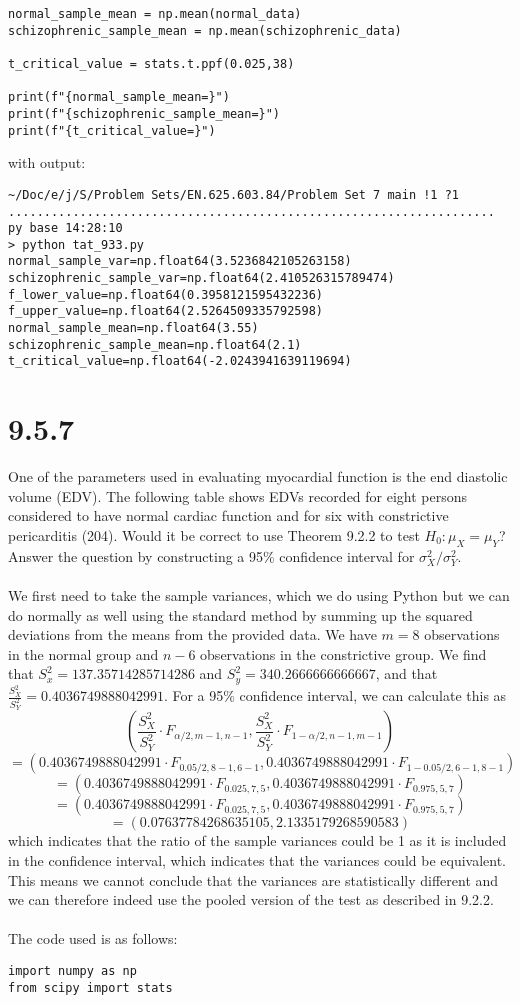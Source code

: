\documentclass{article}
\begin{document}
{\begin{verbatim}
normal_sample_mean = np.mean(normal_data)
schizophrenic_sample_mean = np.mean(schizophrenic_data)

t_critical_value = stats.t.ppf(0.025,38)

print(f"{normal_sample_mean=}")
print(f"{schizophrenic_sample_mean=}")
print(f"{t_critical_value=}")
\end{verbatim}
with output:
\begin{verbatim}
~/Doc/e/j/S/Problem Sets/EN.625.603.84/Problem Set 7 main !1 ?1 .................................................................... py base 14:28:10
> python tat_933.py
normal_sample_var=np.float64(3.5236842105263158)
schizophrenic_sample_var=np.float64(2.410526315789474)
f_lower_value=np.float64(0.3958121595432236)
f_upper_value=np.float64(2.5264509335792598)
normal_sample_mean=np.float64(3.55)
schizophrenic_sample_mean=np.float64(2.1)
t_critical_value=np.float64(-2.0243941639119694)
\end{verbatim}

\section*{9.5.7}

One of the parameters used in evaluating myocardial function is the end diastolic volume (EDV). The following table shows EDVs recorded for eight persons considered to have normal cardiac function and for six with constrictive pericarditis (204). Would it be correct to use Theorem 9.2.2 to test \(H_0: \mu_X = \mu_Y\)? Answer the question by constructing a 95\% confidence interval for \(\sigma^2_X / \sigma^2_Y\).
\\
\\
We first need to take the sample variances, which we do using Python but we can do normally as well using the standard method by summing up the squared deviations from the means from the provided data. We have \(m = 8\) observations in the normal group and \(n - 6\) observations in the constrictive group. We find that \(S^2_x = 137.35714285714286\) and \(S^2_y = 340.2666666666667\), and that \(\frac{S^2_X}{S^2_Y} = 0.4036749888042991\). For a 95\% confidence interval, we can calculate this as 
\[
(\frac{S^2_X}{S^2_Y} \cdot F_{\alpha / 2, m - 1, n - 1}, \frac{S^2_X}{S^2_Y} \cdot F_{1 - \alpha / 2, n - 1, m - 1})
\]
\[
= (0.4036749888042991 \cdot F_{0.05 / 2, 8 - 1, 6 - 1}, 0.4036749888042991 \cdot F_{1 - 0.05 / 2, 6 - 1, 8 - 1})
\]
\[
= (0.4036749888042991 \cdot F_{0.025 , 7, 5}, 0.4036749888042991 \cdot F_{0.975, 5, 7})
\]
\[
= (0.4036749888042991 \cdot F_{0.025 , 7, 5}, 0.4036749888042991 \cdot F_{0.975, 5, 7})
\]
\[
= (0.07637784268635105, 2.1335179268590583)
\]
which indicates that the ratio of the sample variances could be 1 as it is included in the confidence interval, which indicates that the variances could be equivalent. This means we cannot conclude that the variances are statistically different and we can therefore indeed use the pooled version of the test as described in 9.2.2.
\\
\\
The code used is as follows:
\begin{verbatim}
import numpy as np
from scipy import stats


\end{verbatim}}
\end{document}
